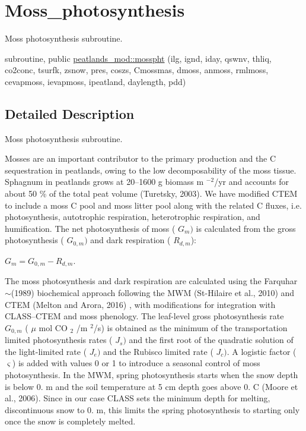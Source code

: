 \hypertarget{group__moss__photosynthesis}{}\section{Moss\+\_\+photosynthesis}
\label{group__moss__photosynthesis}


Moss photosynthesis subroutine.  


\begin{DoxyCompactItemize}
\item 
subroutine, public \hyperlink{group__moss__photosynthesis_ga84f8b27aaf29d0ca4b5c06e3972951a5}{peatlands\+\_\+mod\+::mosspht} (ilg, ignd, iday, qswnv, thliq, co2conc, tsurfk, zsnow, pres, coszs, Cmossmas, dmoss, anmoss, rmlmoss, cevapmoss, ievapmoss, ipeatland, daylength, pdd)
\end{DoxyCompactItemize}


\subsection{Detailed Description}
Moss photosynthesis subroutine. 

Mosses are an important contributor to the primary production and the C sequestration in peatlands, owing to the low decomposability of the moss tissue. Sphagnum in peatlands grows at 20--1600 g biomass m $^{-2} $/yr and accounts for about 50 \% of the total peat volume (Turetsky, 2003). We have modified C\+T\+E\+M to include a moss C pool and moss litter pool along with the related C fluxes, i.\+e. photosynthesis, autotrophic respiration, heterotrophic respiration, and humification. The net photosynthesis of moss ( $G_m)$ is calculated from the gross photosynthesis ( $G_{0,m})$ and dark respiration ( $R_{d,m}$)\+:

$ G_m=G_{0,m}-R_{d,m} $.

The moss photosynthesis and dark respiration are calculated using the Farquhar$\sim$(1989) biochemical approach following the M\+W\+M (St-\/\+Hilaire et al., 2010) \cite{St-Hilaire2010-5e9} and C\+T\+E\+M (Melton and Arora, 2016) \cite{Melton2016-zx}, with modifications for integration with C\+L\+A\+S\+S--C\+T\+E\+M and moss phenology. The leaf-\/level gross photosynthesis rate $G_{0,m} $ ( $\mu $ mol C\+O $_2 $ /m $^2 $/s) is obtained as the minimum of the transportation limited photosynthesis rates ( $J_s)$ and the first root of the quadratic solution of the light-\/limited rate ( $J_e)$ and the Rubisco limited rate ( $J_c)$. A logistic factor ( $\varsigma$) is added with values 0 or 1 to introduce a seasonal control of moss photosynthesis. In the M\+W\+M, spring photosynthesis starts when the snow depth is below 0. m and the soil temperature at 5 cm depth goes above 0. C (Moore et al., 2006). Since in our case C\+L\+A\+S\+S sets the minimum depth for melting, discontinuous snow to 0. m, this limits the spring photosynthesis to starting only once the snow is completely melted.

